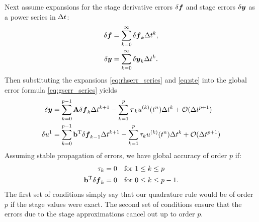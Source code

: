 Next assume expansions for the stage derivative errors $\delta\boldsymbol{f}$ and
stage errors $\delta\boldsymbol{y}$ as a power series in $\Delta t$:
\begin{subequations} \label{eq:err_series}
\begin{align} \label{eq:rhserr_series}
\delta\boldsymbol{f} & = \sum_{k=0}^{\infty} \delta\boldsymbol{f}_k \Delta t^{k}, \\
\delta\boldsymbol{y} & = \sum_{k=0}^{\infty} \delta\boldsymbol{y}_k \Delta t^{k}.
\label{eq:gserr_power_series}
\end{align}
\end{subequations}
Then substituting the expansions \eqref{eq:rhserr_series} and \eqref{eq:ste}
into the global error formula \eqref{eq:gserr_series} yields
\begin{subequations} \label{eq:gserr_rec_both}
\begin{align} \label{eq:gserr_rec}
\delta\boldsymbol{y} & = \sum_{k=0}^{p-1} \mathbf{A} \delta\boldsymbol{f}_k \Delta t^{k+1} -\sum_{k=1}^{p} \boldsymbol{\tau}_k u^{(k)}(t^{n}) \Delta t^k + {\cal O}(\Delta t^{p+1}) \\
\delta u^{1} & = \sum_{k=0}^{p-1} \mathbf{b}^\mathrm{T}\delta\boldsymbol{f}_{k-1} \Delta t^{k+1} -\sum_{k=1}^{p} \tau_k u^{(k)}(t^{n}) \Delta t^k + {\cal O}(\Delta t^{p+1}) 
\end{align}
\end{subequations}
Assuming stable propagation of errors, we have global accuracy of order $p$ if:
\begin{align*}    
\tau_k & = 0  & \mbox{for }  & 1\le k\le p \\
\mathbf{b}^\mathrm{T}\delta\boldsymbol{f}_k & = 0 &  \mbox{for } & 0\le k\le p-1.
\end{align*}
The first set of conditions simply say that our quadrature rule would be of order $p$
if the stage values were exact.
The second set of conditions ensure that the errors due to the stage approximations
cancel out up to order $p$.

